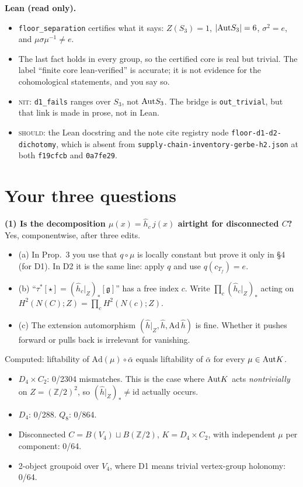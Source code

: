 \documentclass[10pt]{article}
\newcommand{\Z}{\mathbb{Z}}
\newcommand{\iss}[1]{\textsc{#1}}
\begin{document}
\textbf{Lean (read only).}
\begin{itemize}
\item \texttt{floor\_separation} certifies what it says: $Z(S_3)=1$, $|\mathrm{Aut} S_3|=6$, $\sigma^2=e$, and $\mu\sigma\mu^{-1}\ne e$.
\item The last fact holds in every group, so the certified core is real but trivial. The label ``finite core lean-verified'' is accurate; it is not evidence for the cohomological statements, and you say so.
\item \iss{nit}: \texttt{d1\_fails} ranges over $S_3$, not $\mathrm{Aut} S_3$. The bridge is \texttt{out\_trivial}, but that link is made in prose, not in Lean.
\item \iss{should}: the Lean docstring and the note cite registry node \texttt{floor-d1-d2-dichotomy}, which is absent from \texttt{supply-chain-inventory-gerbe-h2.json} at both \texttt{f19cfcb} and \texttt{0a7fe29}.
\end{itemize}

\section{Your three questions}
\textbf{(1) Is the decomposition $\mu(x)=\hat h_c\,j(x)$ airtight for disconnected $C$?} Yes, componentwise, after three edits.
\begin{itemize}
\item (a) In Prop.~3 you use that $q\circ\mu$ is locally constant but prove it only in \S4 (for D1). In D2 it is the same line: apply $q$ and use $q(c_{T_f})=e$.
\item (b) ``$\tau^*[\star]=(\hat h_c|_Z)_*[\mathfrak g]$'' has a free index $c$. Write $\prod_c(\hat h_c|_Z)_*$ acting on $H^2(N(C);Z)=\prod_cH^2(N(c);Z)$.
\item (c) The extension automorphism $(\hat h|_Z,\hat h,\mathrm{Ad}\,\hat h)$ is fine. Whether it pushes forward or pulls back is irrelevant for vanishing.
\end{itemize}
Computed: liftability of $\mathrm{Ad}(\mu)\circ\bar\alpha$ equals liftability of $\bar\alpha$ for every $\mu\in\mathrm{Aut} K$.
\begin{itemize}
\item $D_4\times C_2$: 0/2304 mismatches. This is the case where $\mathrm{Aut} K$ acts \emph{nontrivially} on $Z=(\Z/2)^2$, so $(\hat h|_Z)_*\ne\mathrm{id}$ actually occurs.
\item $D_4$: 0/288. $Q_8$: 0/864.
\item Disconnected $C=B(V_4)\sqcup B(\Z/2)$, $K=D_4\times C_2$, with independent $\mu$ per component: 0/64.
\item 2-object groupoid over $V_4$, where D1 means trivial vertex-group holonomy: 0/64.
\end{itemize}
\end{document}
